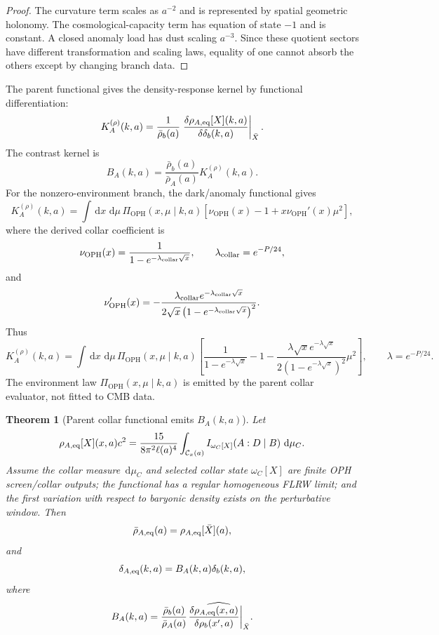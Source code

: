 \documentclass[11pt]{article}
\newtheorem{theorem}{Theorem}[section]
\newcommand{\OPH}{\mathrm{OPH}}
\newcommand{\dd}{\,\mathrm d}
\begin{document}
\begin{proof}
The curvature term scales as \(a^{-2}\) and is represented by spatial geometric holonomy. The
cosmological-capacity term has equation of state \(-1\) and is constant. A closed anomaly load has
dust scaling \(a^{-3}\). Since these quotient sectors have different transformation and scaling
laws, equality of one cannot absorb the others except by changing branch data.
\end{proof}

The parent functional gives the density-response kernel by functional differentiation:
\[
K_A^{(\rho)}(k,a)
=
\frac{1}{\bar\rho_b(a)}
\left.
\frac{\delta\rho_{A,\rm eq}[X](k,a)}
{\delta\delta_b(k,a)}
\right|_{\bar X}.
\]
The contrast kernel is
\[
\boxed{
B_A(k,a)
=
\frac{\bar\rho_b(a)}{\bar\rho_A(a)}
K_A^{(\rho)}(k,a).
}
\]
For the nonzero-environment branch, the dark/anomaly functional gives
\[
K_A^{(\rho)}(k,a)
=
\int\dd x\,\dd\mu\,
\Pi_{\OPH}(x,\mu\mid k,a)
\left[
\nu_{\OPH}(x)-1+x\nu_{\OPH}'(x)\mu^2
\right],
\]
where the derived collar coefficient is
\[
\nu_{\OPH}(x)
=
\frac{1}{1-e^{-\lambda_{\rm collar}\sqrt{x}}},
\qquad
\lambda_{\rm collar}=e^{-P/24},
\]
and
\[
\nu_{\OPH}'(x)
=
-\frac{
\lambda_{\rm collar}
e^{-\lambda_{\rm collar}\sqrt{x}}
}{
2\sqrt{x}
\left(1-e^{-\lambda_{\rm collar}\sqrt{x}}\right)^2
}.
\]
Thus
\[
\boxed{
K_A^{(\rho)}(k,a)
=
\int\dd x\,\dd\mu\,
\Pi_{\OPH}(x,\mu\mid k,a)
\left[
\frac{1}{1-e^{-\lambda\sqrt{x}}}
-1
-
\frac{
\lambda\sqrt{x}
e^{-\lambda\sqrt{x}}
}{
2\left(1-e^{-\lambda\sqrt{x}}\right)^2
}
\mu^2
\right],
\qquad
\lambda=e^{-P/24}.
}
\]
The environment law \(\Pi_{\OPH}(x,\mu\mid k,a)\) is emitted by the parent collar evaluator, not
fitted to CMB data.

\begin{theorem}[Parent collar functional emits \(B_A(k,a)\)]\label{thm:parent-emits-ba}
Let
\[
\rho_{A,\rm eq}[X](x,a)c^2
=
\frac{15}{8\pi^2\ell(a)^4}
\int_{\mathcal C_x(a)}
I_{\omega_C[X]}(A:D\mid B)\,\dd\mu_C.
\]
Assume the collar measure \(\dd\mu_C\) and selected collar state \(\omega_C[X]\) are finite OPH
screen/collar outputs; the functional has a regular homogeneous FLRW limit; and the first variation
with respect to baryonic density exists on the perturbative window. Then
\[
\bar\rho_{A,\rm eq}(a)=\rho_{A,\rm eq}[\bar X](a),
\]
and
\[
\delta_{A,\rm eq}(k,a)=B_A(k,a)\delta_b(k,a),
\]
where
\[
B_A(k,a)
=
\frac{\bar\rho_b(a)}{\bar\rho_A(a)}
\widehat{
\left.
\frac{\delta\rho_{A,\rm eq}(x,a)}
{\delta\rho_b(x',a)}
\right|_{\bar X}
}.
\]
\end{theorem}
\end{document}
